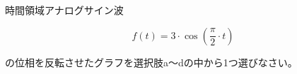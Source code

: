 時間領域アナログサイン波

\[
f(t) = 3 \cdot \cos \left ( \frac{\pi}{2} \cdot t \right )
\]

\bigskip
\noindent  の位相を反転させたグラフを選択肢a〜dの中から1つ選びなさい。
